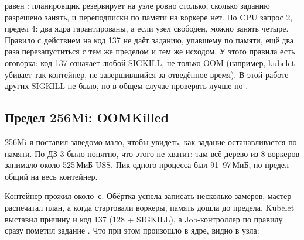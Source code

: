
 равен : планировщик резервирует на узле ровно столько, сколько заданию разрешено занять, и переподписки по памяти на воркере нет. По CPU запрос 2, предел 4: два ядра гарантированы, а если узел свободен, можно занять четыре. Правило  с действием  на код 137 не даёт заданию, упавшему по памяти, ещё два раза перезапуститься с тем же пределом и тем же исходом. У этого правила есть оговорка: код 137 означает любой SIGKILL, не только OOM (например, kubelet убивает так контейнер, не завершившийся за отведённое время). В этой работе других SIGKILL не было, но в общем случае проверять лучше по .

\subsection{Предел 256Mi: OOMKilled}
256Mi я поставил заведомо мало, чтобы увидеть, как задание останавливается по памяти. По ДЗ 3 было понятно, что этого не хватит: там всё дерево из 8 воркеров занимало около 525\,МиБ USS. Пик одного процесса был 91--97\,МиБ, но предел общий на весь контейнер.


Контейнер прожил около \oomSeconds\,с. Обёртка успела записать несколько замеров, мастер распечатал план, а когда стартовали воркеры, память дошла до предела. Kubelet выставил причину  и код 137 (128 + SIGKILL), а Job-контроллер по правилу  сразу пометил задание . Что при этом произошло в ядре, видно в  узла:


